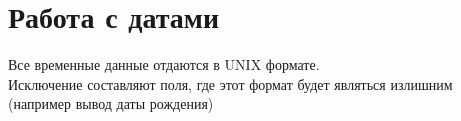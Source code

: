 \section{Работа с датами}
\par
Все временные данные отдаются в UNIX формате.  \\
Исключение составляют поля, где этот формат будет являться излишним (например вывод даты рождения)
